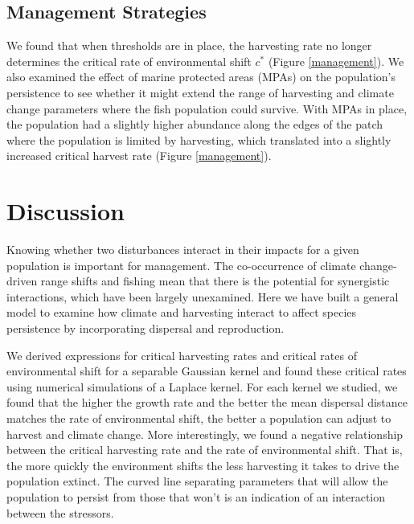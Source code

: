 \documentclass[12pt,english]{article}
\begin{document}
\begin{spacing}{1.9}
\begin{flushleft}
\subsection{Management Strategies }

We found that when thresholds are in place, the harvesting rate no longer determines the critical rate of environmental shift $c^*$ (Figure \ref{management}). We also examined the effect of marine protected  areas (MPAs) on the population's persistence to see whether it might extend the range of harvesting and  climate change parameters where the fish population could survive. With MPAs in place, the population had a  slightly higher abundance along the edges of the patch where the population is limited by harvesting, which  translated into a slightly increased critical harvest rate (Figure \ref{management}).

\section{Discussion}

Knowing whether two disturbances interact in their impacts for a given population is important for management. The co-occurrence of climate change-driven range shifts and fishing mean that there is the potential for synergistic interactions, which have been largely unexamined.  Here we have built a general model to examine how climate and harvesting interact to affect species persistence by incorporating dispersal and reproduction. 

We derived expressions for critical harvesting rates and critical rates of environmental shift for a separable Gaussian kernel and found these critical rates using numerical simulations of a Laplace kernel.  For each kernel we studied, we found that the higher the growth rate and the better the mean dispersal distance matches the rate of environmental shift, the better a population can adjust to harvest and climate change.  More interestingly, we found a negative relationship between the critical harvesting rate and the rate of environmental shift.  That is, the more quickly the environment shifts the less harvesting it takes to drive the population extinct.  The curved line separating parameters that will allow the population to persist from those that won't is an indication of an interaction between the stressors.


\end{flushleft}
\end{spacing}
\end{document}
